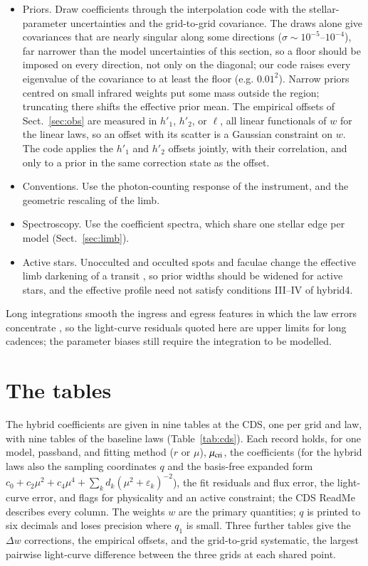 \documentclass{aa}
\begin{document}
\begin{itemize}
at 3500\,K, which our code substitutes; since the weights behave differently
below 3500\,K (Fig.~\ref{fig:coef}), this is a lower limit.
\item Priors. Draw coefficients through the interpolation code with the
stellar-parameter uncertainties and the grid-to-grid covariance. The draws
alone give covariances that are nearly singular along some directions
($\sigma\sim10^{-5}$--$10^{-4}$), far narrower than the model uncertainties of
this section, so a floor should be imposed on every direction, not only on
the diagonal; our code raises every eigenvalue of the covariance to at least
the floor (e.g. $0.01^2$). Narrow priors
centred on small infrared weights put some mass outside the region; truncating
there shifts the effective prior mean. The
empirical offsets of Sect.~\ref{sec:obs} are measured in $h'_1$, $h'_2$, or
$\ell$, all linear functionals of $w$ for the linear laws, so an offset with its
scatter is a Gaussian constraint on $w$. The code applies the $h'_1$ and $h'_2$
offsets jointly, with their correlation, and only to a prior in the same
correction state as the offset.
\item Conventions. Use the photon-counting response of the instrument, and the
geometric rescaling of the limb.
\item Spectroscopy. Use the coefficient spectra, which share one stellar edge
per model (Sect.~\ref{sec:limb}).
\item Active stars. Unocculted and occulted spots and faculae change the
effective limb darkening of a transit \citep{ballerini2012,csizmadia2013}, so
prior widths should be widened for active stars, and the effective profile
need not satisfy conditions III--IV of hybrid4.
\end{itemize}
Long integrations smooth the ingress and egress features in which the law
errors concentrate \citep{kipping2010}, so the light-curve residuals quoted
here are upper limits for long cadences; the parameter biases still require
the integration to be modelled.

\section{The tables}\label{sec:tables}
The hybrid coefficients are given in nine tables at the CDS, one per grid
and law, with nine tables of the baseline laws (Table~\ref{tab:cds}). Each record holds, for one model, passband, and fitting
method ($r$ or $\mu$), $\mu_{\rm cri}$, the coefficients (for the hybrid laws
also the sampling coordinates $q$ and the basis-free expanded form
$c_0+c_2\mu^2+c_4\mu^4+\sum_k d_k(\mu^2+\varepsilon_k)^{-2}$), the fit
residuals and flux error, the light-curve error, and flags for physicality
and an active constraint; the CDS ReadMe describes every column. The weights
$w$ are the primary quantities; $q$ is printed to six decimals and loses
precision where $q_1$ is small. Three further tables give the $\Delta w$
corrections, the empirical offsets, and the grid-to-grid systematic, the
largest pairwise light-curve difference between the three grids at each
shared point.
\end{document}
